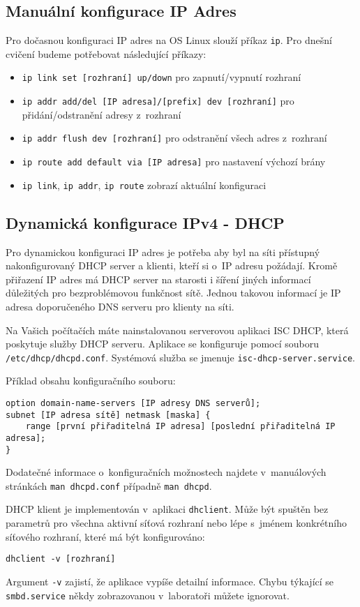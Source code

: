 \subsection{Manuální konfigurace IP Adres}\label{ip-manual}
Pro dočasnou konfiguraci IP adres na OS Linux slouží příkaz {\tt ip}. Pro
dnešní cvičení budeme potřebovat následující příkazy:
\begin{itemize}
    \item \verb_ip link set [rozhraní] up/down_ pro zapnutí/vypnutí rozhraní
    \item \verb_ip addr add/del [IP adresa]/[prefix] dev [rozhraní]_ pro
        přidání/odstranění adresy z~rozhraní
    \item \verb_ip addr flush dev [rozhraní]_ pro odstranění všech adres
z~rozhraní
    \item \verb_ip route add default via [IP adresa]_ pro nastavení výchozí
        brány
    \item \verb_ip link_, \verb_ip addr_, \verb_ip route_ zobrazí aktuální
        konfiguraci
\end{itemize}

\subsection{Dynamická konfigurace IPv4 - DHCP}\label{dhcp}
Pro dynamickou konfiguraci IP adres je potřeba aby byl na síti přístupný
nakonfigurovaný DHCP server a klienti, kteří si o~IP adresu požádají. Kromě
přiřazení IP adres má DHCP server na starosti i šíření jiných informací
důležitých pro bezproblémovou funkčnost sítě. Jednou takovou informací je IP
adresa doporučeného DNS serveru pro klienty na síti.

Na Vašich počítačích máte nainstalovanou serverovou aplikaci ISC DHCP, která
poskytuje služby DHCP serveru. Aplikace se konfiguruje pomocí souboru
\verb_/etc/dhcp/dhcpd.conf_. Systémová služba se jmenuje
\texttt{isc-dhcp-server.service}.

Příklad obsahu konfiguračního souboru:
\begin{verbatim}
option domain-name-servers [IP adresy DNS serverů];
subnet [IP adresa sítě] netmask [maska] {
    range [první přiřaditelná IP adresa] [poslední přiřaditelná IP adresa];
}
\end{verbatim}
Dodatečné informace o~konfiguračních možnostech najdete v~manuálových stránkách
{\tt man dhcpd.conf} případně {\tt man dhcpd}.

DHCP klient je implementován v~aplikaci \texttt{dhclient}. Může být spuštěn bez
parametrů pro všechna aktivní síťová rozhraní nebo lépe s~jménem konkrétního
síťového rozhraní, které má být konfigurováno:
\begin{verbatim}
dhclient -v [rozhraní]
\end{verbatim}
Argument \texttt{-v} zajistí, že aplikace vypíše detailní informace.
Chybu týkající se {\tt smbd.service} někdy zobrazovanou v~laboratoři můžete ignorovat.

